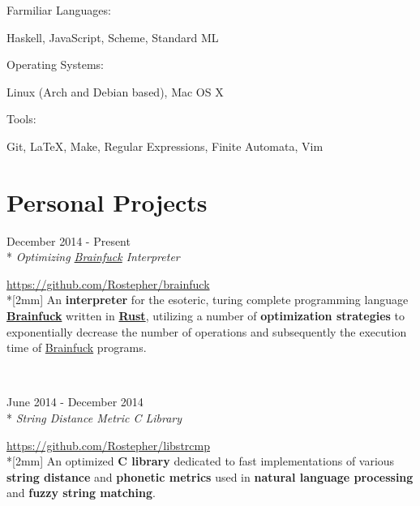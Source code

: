 \documentclass[a4paper,margin,line]{resume}
\newcommand{\rvspace}{2mm} %
\newcommand{\rurl}[1]{\hfill {\footnotesize \url{#1}}}
\newcommand{\rdate}[1]{\hfill {\small #1}}
\newcommand{\rdescription}[1]{\small #1 \normalsize}
\newcommand{\ritem}[5] {
    \item[#1]                               %
    \hfill \rdate{#2} \\*                   %
    \hfill {\small \emph{#3}}               %
    \strut \hfill \rurl{#4} \\*[\rvspace]   %
    \rdescription{#5}                       %
}
\newcommand{\rproject}{\ritem}
\begin{document}
\begin{resume}
\begin{compactdesc}
        \item[Farmiliar Languages:]
        \begin{asparablank} {\small
            \item Haskell, JavaScript, Scheme, Standard ML
        } \end{asparablank}

        \item[Operating Systems:]
        \begin{asparablank} {\small
            \item Linux (Arch and Debian based), Mac OS X
        } \end{asparablank}

		\item[Tools:]
        \begin{asparablank} { \small
            \item Git, \LaTeX, Make, Regular Expressions, Finite Automata, Vim
		} \end{asparablank}
	\end{compactdesc}

\section{\mysidestyle Personal Projects}
    \begin{asparadesc}
        \rproject {brainfuck}
                  {December 2014 - Present}
                  {Optimizing \href{https://en.wikipedia.org/wiki/Brainfuck}
                                   {Brainfuck} Interpreter}
                  {https://github.com/Rostepher/brainfuck}
        {
            An {\bf interpreter} for the esoteric, turing complete programming
            language \href{https://en.wikipedia.org/wiki/Brainfuck}{\bf Brainfuck}
            written in \href{https://rust-lang.org}{\bf Rust}, utilizing a
            number of {\bf optimization strategies} to exponentially decrease
            the number of operations and subsequently the execution time of
            \href{https://en.wikipedia.org/wiki/Brainfuck}{Brainfuck} programs.
        }
        \\

        \rproject {libstrcmp}
                  {June 2014 - December 2014}
                  {String Distance Metric C Library}
                  {https://github.com/Rostepher/libstrcmp}
        {
            An optimized {\bf C library} dedicated to fast implementations of
            various {\bf string distance} and {\bf phonetic metrics} used
            in {\bf natural language processing} and {\bf fuzzy string matching}.
        }
        \\


\end{asparadesc}
\end{resume}
\end{document}

